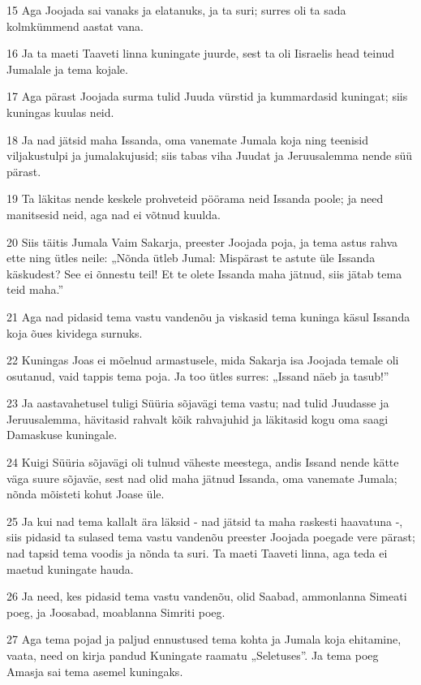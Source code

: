 \par 15 Aga Joojada sai vanaks ja elatanuks, ja ta suri; surres oli ta sada kolmkümmend aastat vana.
\par 16 Ja ta maeti Taaveti linna kuningate juurde, sest ta oli Iisraelis head teinud Jumalale ja tema kojale.
\par 17 Aga pärast Joojada surma tulid Juuda vürstid ja kummardasid kuningat; siis kuningas kuulas neid.
\par 18 Ja nad jätsid maha Issanda, oma vanemate Jumala koja ning teenisid viljakustulpi ja jumalakujusid; siis tabas viha Juudat ja Jeruusalemma nende süü pärast.
\par 19 Ta läkitas nende keskele prohveteid pöörama neid Issanda poole; ja need manitsesid neid, aga nad ei võtnud kuulda.
\par 20 Siis täitis Jumala Vaim Sakarja, preester Joojada poja, ja tema astus rahva ette ning ütles neile: „Nõnda ütleb Jumal: Mispärast te astute üle Issanda käskudest? See ei õnnestu teil! Et te olete Issanda maha jätnud, siis jätab tema teid maha.”
\par 21 Aga nad pidasid tema vastu vandenõu ja viskasid tema kuninga käsul Issanda koja õues kividega surnuks.
\par 22 Kuningas Joas ei mõelnud armastusele, mida Sakarja isa Joojada temale oli osutanud, vaid tappis tema poja. Ja too ütles surres: „Issand näeb ja tasub!”
\par 23 Ja aastavahetusel tuligi Süüria sõjavägi tema vastu; nad tulid Juudasse ja Jeruusalemma, hävitasid rahvalt kõik rahvajuhid ja läkitasid kogu oma saagi Damaskuse kuningale.
\par 24 Kuigi Süüria sõjavägi oli tulnud väheste meestega, andis Issand nende kätte väga suure sõjaväe, sest nad olid maha jätnud Issanda, oma vanemate Jumala; nõnda mõisteti kohut Joase üle.
\par 25 Ja kui nad tema kallalt ära läksid - nad jätsid ta maha raskesti haavatuna -, siis pidasid ta sulased tema vastu vandenõu preester Joojada poegade vere pärast; nad tapsid tema voodis ja nõnda ta suri. Ta maeti Taaveti linna, aga teda ei maetud kuningate hauda.
\par 26 Ja need, kes pidasid tema vastu vandenõu, olid Saabad, ammonlanna Simeati poeg, ja Joosabad, moablanna Simriti poeg.
\par 27 Aga tema pojad ja paljud ennustused tema kohta ja Jumala koja ehitamine, vaata, need on kirja pandud Kuningate raamatu „Seletuses”. Ja tema poeg Amasja sai tema asemel kuningaks.

